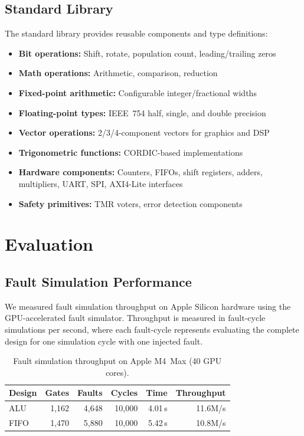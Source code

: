 \documentclass[conference]{IEEEtran}
\begin{document}
\subsection{Standard Library}

The standard library provides reusable components and type definitions:

\begin{itemize}
  \item \textbf{Bit operations:} Shift, rotate, population count, leading/trailing zeros
  \item \textbf{Math operations:} Arithmetic, comparison, reduction
  \item \textbf{Fixed-point arithmetic:} Configurable integer/fractional widths
  \item \textbf{Floating-point types:} IEEE~754 half, single, and double precision
  \item \textbf{Vector operations:} 2/3/4-component vectors for graphics and DSP
  \item \textbf{Trigonometric functions:} CORDIC-based implementations
  \item \textbf{Hardware components:} Counters, FIFOs, shift registers, adders, multipliers, UART, SPI, AXI4-Lite interfaces
  \item \textbf{Safety primitives:} TMR voters, error detection components
\end{itemize}

\section{Evaluation}
\label{sec:evaluation}

\subsection{Fault Simulation Performance}

We measured fault simulation throughput on Apple Silicon hardware using the GPU-accelerated fault simulator. Throughput is measured in fault-cycle simulations per second, where each fault-cycle represents evaluating the complete design for one simulation cycle with one injected fault.

\begin{table}[t]
  \centering
  \caption{Fault simulation throughput on Apple M4~Max (40 GPU cores).}
  \label{tab:faultsim}
  \begin{tabular}{@{}lrrrrr@{}}
    \toprule
    Design & Gates & Faults & Cycles & Time & Throughput \\
    \midrule
    ALU  & 1,162 & 4,648 & 10,000 & 4.01\,s & 11.6M/s \\
    FIFO & 1,470 & 5,880 & 10,000 & 5.42\,s & 10.8M/s \\
    \bottomrule
  \end{tabular}
\end{table}
\end{document}
